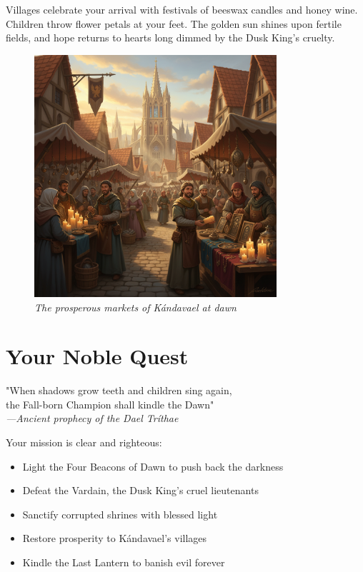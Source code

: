 \documentclass[11pt,a4paper,twoside]{book}
\begin{document}
Villages celebrate your arrival with festivals of beeswax candles and honey wine. Children throw flower petals at your feet. The golden sun shines upon fertile fields, and hope returns to hearts long dimmed by the Dusk King's cruelty.

\begin{figure}[h]
\centering
\includegraphics[width=0.8\textwidth]{images/market_dawn_2025-09-03T22-29-52-092Z_1.png}
\caption*{\textit{The prosperous markets of Kándavael at dawn}}
\end{figure}

\section{Your Noble Quest}

\begin{tcolorbox}[heroicbox={The Prophecy}]
\centering
\displayfont\large
"When shadows grow teeth and children sing again,\\
the Fall-born Champion shall kindle the Dawn"\\
\normalfont
\vspace{1em}
\textit{—Ancient prophecy of the Dael Tríthae}
\end{tcolorbox}

Your mission is clear and righteous:
\begin{itemize}
    \item Light the Four Beacons of Dawn to push back the darkness
    \item Defeat the Vardain, the Dusk King's cruel lieutenants  
    \item Sanctify corrupted shrines with blessed light
    \item Restore prosperity to Kándavael's villages
    \item Kindle the Last Lantern to banish evil forever
\end{itemize}
\end{document}
